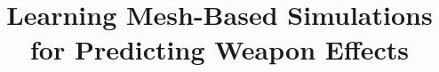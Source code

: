 \documentclass{NSF}
\begin{document}



\title{Learning Mesh-Based Simulations for Predicting Weapon Effects}




\newpage{}


\newpage{}


\newpage{}


\newpage{}


\newpage{}


\newpage{}


\newpage{}
\renewcommand\refname{References Cited}



\newpage{}

\end{document}
